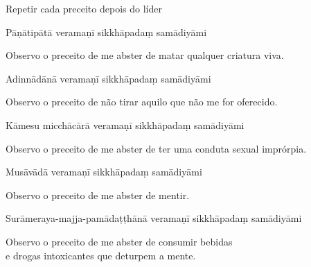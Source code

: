 {\begin{instruction}
  Repetir cada preceito depois do líder
\end{instruction}

\begin{precept}
  \setcounter{enumi}{0}
  \item Pāṇātipātā veramaṇī sikkhāpadaṃ samādiyāmi
\end{precept}

\begin{english}
  Observo o preceito de me abster de matar qualquer criatura viva.
\end{english}

\begin{precept}
  \setcounter{enumi}{1}
  \item Adinnādānā veramaṇī sikkhāpadaṃ samādiyāmi
\end{precept}

\begin{english}
  Observo o preceito de não tirar aquilo que não me for oferecido.
\end{english}

\begin{precept}
  \setcounter{enumi}{2}
  \item Kāmesu micchācārā veramaṇī sikkhāpadaṃ samādiyāmi
\end{precept}

\begin{english}
  Observo o preceito de me abster de ter uma conduta sexual imprórpia.
\end{english}

\begin{precept}
  \setcounter{enumi}{3}
  \item Musāvādā veramaṇī sikkhāpadaṃ samādiyāmi
\end{precept}

\begin{english}
  Observo o preceito de me abster de mentir.
\end{english}

\begin{precept}
  \setcounter{enumi}{4}
  \item Surāmeraya-majja-pamādaṭṭhānā veramaṇī sikkhāpadaṃ samādiyāmi
\end{precept}

\begin{english}
  Observo o preceito de me abster de consumir bebidas\\
  e drogas intoxicantes que deturpem a mente.
\end{english}

}
